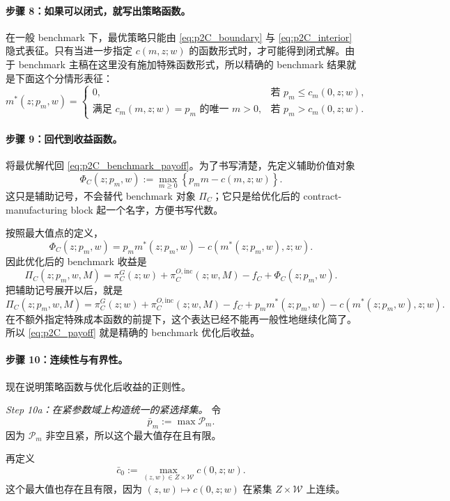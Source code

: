 \paragraph{步骤 8：如果可以闭式，就写出策略函数。}
在一般 benchmark 下，最优策略只能由 \eqref{eq:p2C_boundary} 与 \eqref{eq:p2C_interior} 隐式表征。只有当进一步指定 $c(m,z;w)$ 的函数形式时，才可能得到闭式解。由于 benchmark 主稿在这里没有施加特殊函数形式，所以精确的 benchmark 结果就是下面这个分情形表征：
\begin{equation}
m^*(z;p_m,w)=
\begin{cases}
0, & \text{若 } p_m\le c_m(0,z;w),\\[0.4em]
\text{满足 } c_m(m,z;w)=p_m \text{ 的唯一 } m>0, & \text{若 } p_m>c_m(0,z;w).
\end{cases}
\label{eq:p2C_policy}
\end{equation}

\paragraph{步骤 9：回代到收益函数。}
将最优解代回 \eqref{eq:p2C_benchmark_payoff}。为了书写清楚，先定义辅助价值对象
\[
\Phi_C(z;p_m,w):=\max_{m\ge 0}\left\{p_m m-c(m,z;w)\right\}.
\]
这只是辅助记号，不会替代 benchmark 对象 $\Pi_C$；它只是给优化后的 contract-manufacturing block 起一个名字，方便书写代数。

按照最大值点的定义，
\[
\Phi_C(z;p_m,w)=p_m m^*(z;p_m,w)-c(m^*(z;p_m,w),z;w).
\]
因此优化后的 benchmark 收益是
\begin{equation}
\Pi_C(z;p_m,w,M)
=
\pi_C^G(z;w)+\pi_C^{O,\mathrm{inc}}(z;w,M)-f_C
+\Phi_C(z;p_m,w).
\label{eq:p2C_payoff}
\end{equation}
把辅助记号展开以后，就是
\[
\Pi_C(z;p_m,w,M)
=
\pi_C^G(z;w)+\pi_C^{O,\mathrm{inc}}(z;w,M)-f_C
+p_m m^*(z;p_m,w)-c(m^*(z;p_m,w),z;w).
\]
在不额外指定特殊成本函数的前提下，这个表达已经不能再一般性地继续化简了。所以 \eqref{eq:p2C_payoff} 就是精确的 benchmark 优化后收益。

\paragraph{步骤 10：连续性与有界性。}
现在说明策略函数与优化后收益的正则性。

\textit{Step 10a：在紧参数域上构造统一的紧选择集。}
令
\[
\bar p_m:=\max\mathcal P_m.
\]
因为 $\mathcal P_m$ 非空且紧，所以这个最大值存在且有限。

再定义
\[
\bar c_0:=\max_{(z,w)\in Z\times \mathcal W} c(0,z;w).
\]
这个最大值也存在且有限，因为 $(z,w)\mapsto c(0,z;w)$ 在紧集 $Z\times \mathcal W$ 上连续。


